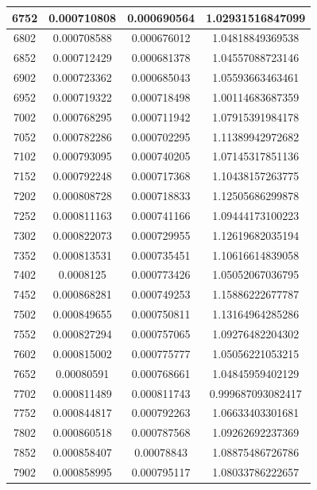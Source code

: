 \documentclass{article}
\begin{document}
\begin{longtable}{|c|c|c|c|}
		6752	&   0.000710808	  & 0.000690564	 &  1.02931516847099   \\ \hline
		6802	&   0.000708588	  & 0.000676012	 &  1.04818849369538   \\ \hline
		6852	&   0.000712429	  & 0.000681378	 &  1.04557088723146   \\ \hline
		6902	&   0.000723362	  & 0.000685043	 &  1.05593663463461   \\ \hline
		6952	&   0.000719322	  & 0.000718498	 &  1.00114683687359   \\ \hline
		7002	&   0.000768295	  & 0.000711942	 &  1.07915391984178   \\ \hline
		7052	&   0.000782286	  & 0.000702295	 &  1.11389942972682   \\ \hline
		7102	&   0.000793095	  & 0.000740205	 &  1.07145317851136   \\ \hline
		7152	&   0.000792248	  & 0.000717368	 &  1.10438157263775   \\ \hline
		7202	&   0.000808728	  & 0.000718833	 &  1.12505686299878   \\ \hline
		7252	&   0.000811163	  & 0.000741166	 &  1.09444173100223   \\ \hline
		7302	&   0.000822073	  & 0.000729955	 &  1.12619682035194   \\ \hline
		7352	&   0.000813531	  & 0.000735451	 &  1.10616614839058   \\ \hline
		7402	&   0.0008125	  & 0.000773426	 &  1.05052067036795   \\ \hline
		7452	&   0.000868281	  & 0.000749253	 &  1.15886222677787   \\ \hline
		7502	&   0.000849655	  & 0.000750811	 &  1.13164964285286   \\ \hline
		7552	&   0.000827294	  & 0.000757065	 &  1.09276482204302   \\ \hline
		7602	&   0.000815002	  & 0.000775777	 &  1.05056221053215   \\ \hline
		7652	&   0.00080591	  & 0.000768661	 &  1.04845959402129   \\ \hline
		7702	&   0.000811489	  & 0.000811743	 &  0.999687093082417   \\ \hline
		7752	&   0.000844817	  & 0.000792263	 &  1.06633403301681   \\ \hline
		7802	&   0.000860518	  & 0.000787568	 &  1.09262692237369   \\ \hline
		7852	&   0.000858407	  & 0.00078843	 &  1.08875486726786   \\ \hline
		7902	&   0.000858995	  & 0.000795117	 &  1.08033786222657   \\ \hline

\end{longtable}
\end{document}
